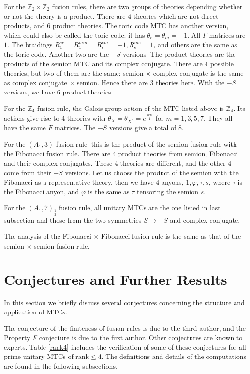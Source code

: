 \documentclass[12pt,psamsfonts]{amsart}
\newcommand{\e}{{\epsilon}}
\newcommand{\Z}{\mathbb Z}
\numberwithin{equation}{section}
\theoremstyle{definition}
\begin{document}
For the $\Z_2\times \Z_2$ fusion rules, there are two groups of
theories depending whether or not the theory is a product.  There
are $4$ theories which are not direct products, and $6$ product
theories.  The toric code MTC has another version, which could
also be called the toric code: it has $\theta_e=\theta_m=-1$. All
$F$ matrices are $1$.  The braidings
$R_{1}^{ee}=R_{1}^{mm}=R_{\e}^{em}=-1,R_{\e}^{me}=1$, and others
are the same as the toric code.  Another two are the $-S$
versions.  The product theories are the products of the semion MTC
and its complex conjugate.  There are $4$ possible theories, but
two of them are the same: semion $\times$ complex conjugate is the
same as complex conjugate $\times$ semion.  Hence there are $3$
theories here.  With the $-S$ versions, we have $6$ product
theories.

For the $\Z_4$ fusion rule, the Galois group action of the MTC
listed above is $\Z_4$.  Its actions give rise to $4$ theories
with $\theta_{X}=\theta_{X^*}=e^{\frac{m\pi i}{4}}$ for
$m=1,3,5,7$.  They all have the same $F$ matrices.  The $-S$
versions give a total of $8$.

For the $(A_1,3)$ fusion rule, this is the product of the semion
fusion rule with the Fibonacci fusion rule.  There are $4$ product
theories from semion, Fibonacci and their complex conjugates.
These $4$ theories are different, and the other $4$ come from
their $-S$ versions.  Let us choose the product of the semion with
the Fibonacci as a representative theory, then we have $4$ anyons,
$1,\varphi,\tau,s$, where $\tau$ is the Fibonacci anyon, and
$\varphi$ is the same as $\tau$ tensoring the semion $s$.

For the $(A_1,7)_{\frac{1}{2}}$ fusion rule, all unitary MTCs are
the one listed in last subsection and those from the two
symmetries $S\rightarrow -S$ and complex conjugate.

The analysis of the Fibonacci $\times$ Fibonacci fusion rule is
the same as that of the semion $\times$ semion fusion rule.





\section{Conjectures and Further Results}\label{conjecture}

In this section we briefly discuss several conjectures concerning the
structure and application of MTCs.

\iffalse The conjecture of the
finiteness of fusion rules is due to the third author, and the
Property \textit{F} conjecture is due to the first author. Other
conjectures are known to experts.  Table \ref{rank4} includes the
verification of some of these conjectures for all
 prime unitary MTCs of rank$\leq$4.  The definitions and details of
the computations are found in the following subsections.
\end{document}

